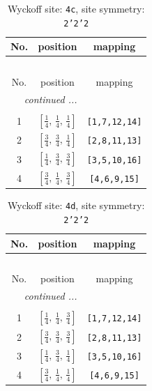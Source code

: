 \documentclass[fleqn,8pt]{jsarticle}
\begin{document}
\renewcommand{\arraystretch}{1.2}
\begin{longtable}{ccc}
\caption{Wyckoff site: {\tt 4c}, site symmetry: {\tt 2'2'2}}
 \\
 \hline \hline
No. & position & mapping \\ \hline \endfirsthead

\multicolumn{2}{l}{\tablename\ \thetable{}} \\
 \hline \hline
No. & position & mapping \\ \hline \endhead

 \hline \hline
\multicolumn{2}{r}{\footnotesize\it continued ...} \\ \endfoot

 \hline \hline
\multicolumn{2}{r}{} \\ \endlastfoot

1 & $\left[ \frac{1}{4},\, \frac{1}{4},\, \frac{1}{4} \right]$ & {\tt [1,7,12,14]} \\ \hline
2 & $\left[ \frac{3}{4},\, \frac{3}{4},\, \frac{1}{4} \right]$ & {\tt [2,8,11,13]} \\ \hline
3 & $\left[ \frac{1}{4},\, \frac{3}{4},\, \frac{3}{4} \right]$ & {\tt [3,5,10,16]} \\ \hline
4 & $\left[ \frac{3}{4},\, \frac{1}{4},\, \frac{3}{4} \right]$ & {\tt [4,6,9,15]} \\
\end{longtable}
\renewcommand{\arraystretch}{1.2}
\begin{longtable}{ccc}
\caption{Wyckoff site: {\tt 4d}, site symmetry: {\tt 2'2'2}}
 \\
 \hline \hline
No. & position & mapping \\ \hline \endfirsthead

\multicolumn{2}{l}{\tablename\ \thetable{}} \\
 \hline \hline
No. & position & mapping \\ \hline \endhead

 \hline \hline
\multicolumn{2}{r}{\footnotesize\it continued ...} \\ \endfoot

 \hline \hline
\multicolumn{2}{r}{} \\ \endlastfoot

1 & $\left[ \frac{1}{4},\, \frac{1}{4},\, \frac{3}{4} \right]$ & {\tt [1,7,12,14]} \\ \hline
2 & $\left[ \frac{3}{4},\, \frac{3}{4},\, \frac{3}{4} \right]$ & {\tt [2,8,11,13]} \\ \hline
3 & $\left[ \frac{1}{4},\, \frac{3}{4},\, \frac{1}{4} \right]$ & {\tt [3,5,10,16]} \\ \hline
4 & $\left[ \frac{3}{4},\, \frac{1}{4},\, \frac{1}{4} \right]$ & {\tt [4,6,9,15]} \\
\end{longtable}
\end{document}
